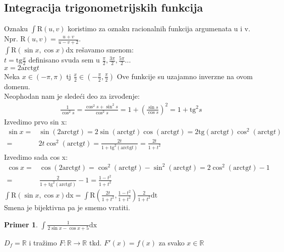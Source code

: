 \documentclass{article}
\newtheorem{prim}{Primer}[section]
\begin{document}
\subsection{Integracija trigonometrijskih funkcija}
Oznaku $\int\text{R}(u, v)$ koristimo za oznaku racionalnih funkcija argumenata u i v. Npr. $\text{R}(u, v) = \frac{u+v}{u-v+2}$.\\
$\int\text{R}(\sin{x}, \cos{x})$dx rešavamo smenom:\\
$t = \text{tg}\frac{x}{2}$ definisano svuda sem u $\frac{\pi}{2}, \frac{3\pi}{2},\frac{5\pi}{2}...$\\
$x = 2\text{arctg}t$\\
Neka $x \in (-\pi, \pi)$ tj $\frac{x}{2} \in (-\frac{\pi}{2}, \frac{\pi}{2})$ Ove funkcije su uzajamno inverzne na ovom domenu.\\
Neophodan nam je sledeći deo za izvođenje:\\
\begin{align*}
    \frac{1}{\cos^2 s}
    = \frac{\cos^2 s + \sin^2 s}{\cos^2 s}
    = 1 + (\frac{\sin s}{\cos s})^2
    = 1 + \text{tg}^2 s
\end{align*}
Izvedimo prvo sin x:
\begin{align*}
    \sin{x} = & \sin{(2\text{arctg} t)} = 2\sin{(\text{arctg} t)}\cos{(\text{arctg} t)}
    = 2\text{tg}(\text{arctg} t)\cos^2(\text{arctg}t)                                   \\
    =         & 2t\cos^2(\text{arctg}t)
    = \frac{2t}{1+\text{tg}^2(\text{arctg}t)}
    = \frac{2t}{1+t^2}
\end{align*}
Izvedimo sada cos x:
\begin{align*}
    \cos{x} = & \cos{(2\text{arctg} t)}
    = \cos^2 (\text{arctg} t) - \sin^2 (\text{arctg} t)
    = 2\cos^2{(\text{arctg} t)} - 1                          \\
    =         & \frac{2}{1 + \text{tg}^2(\text{arctg}t)} - 1
    = \frac{1-t^2}{1+t^2}
\end{align*}
$\int\text{R}(\sin{x}, \cos{x})\text{dx}
    = \int\text{R}(\frac{2t}{1+t^2}, \frac{1-t^2}{1+t^2})\frac{2}{1+t^2}\text{dt}$\\
Smena je bijektivna pa je smemo vratiti.\\
\begin{primbox}
    \begin{prim}
        $\int\frac{1}{2\sin{x}-\cos{x}+5}\text{dx}$
    \end{prim}
\end{primbox}
$D_f = \mathbb{R}$ i tražimo $F: \mathbb{R}\longrightarrow\mathbb{R}$ tkd. $F'(x) = f(x)$ za svako $x \in \mathbb{R}$\\
\end{document}
